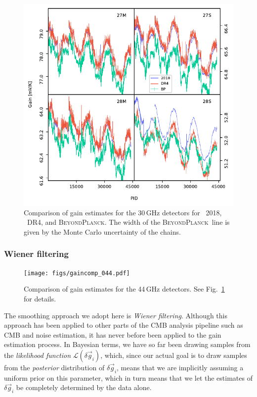 \documentclass[twocolumn]{aa}
\newcommand{\g}[0]{\vec{g}}
\newcommand{\BP}{\textsc{BeyondPlanck}}
\begin{document}
\begin{figure}[t]
  \center
  \includegraphics[width=\linewidth]{figs/gaincomp_030.pdf}
    \caption{Comparison of gain estimates for the 30\,GHz detectors for \Planck\ 2018, \Planck\ DR4, and \BP. 
    The width of the \BP\ line is given by the Monte Carlo uncertainty of the chains.}
  \label{fig:gaincomp_030}
\end{figure}

\subsubsection{Wiener filtering}
\begin{figure}[t]
  \center
  \texttt{[image: figs/gaincomp\_044.pdf]}
    \caption{Comparison of gain estimates for the 44\,GHz detectors. 
    See Fig.~\ref{fig:gaincomp_030} for details.}
  \label{fig:gaincomp_044}
\end{figure}

The smoothing approach we adopt here is \emph{Wiener filtering}. Although this approach has been applied to other parts of the CMB analysis pipeline such as CMB and noise estimation, it has never before been applied to the gain estimation process. In Bayesian terms, we have so far been drawing samples from the \emph{likelihood function} $\mathcal{L}(\delta \g_i)$, which, since our actual goal is to draw samples from the \emph{posterior} distribution of $\delta \g_i$, means that we are implicitly assuming a uniform prior on this parameter, which in turn means that we let the estimates of $\delta \g_i$ be completely determined by the data alone. 
\end{document}
